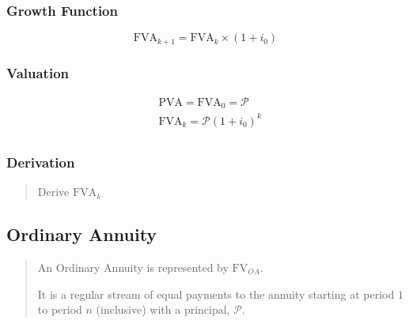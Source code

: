 \documentclass{article} %
\newcommand{\FVA}{\mathrm{FVA}} %
\newcommand{\PVA}{\mathrm{PVA}} %
\newcommand{\FV}{\mathrm{FV}} %
\newcommand{\p}{\mathcal{P}} %
\newcommand{\FVOA}{\FV_{O\!A}} %
\begin{document}
\subsubsection{Growth Function}
\[\FVA_{k+1} = \FVA_{k} \times (1 + i_0)\]

\subsubsection{Valuation}
\begin{align*}
     & \PVA = \FVA_0 = \p        \\
     & \FVA_k = \p (1 + i_0) ^ k \\
\end{align*}
\subsubsection{Derivation}
\begin{quote}
    Derive $\FVA_{k}$
\end{quote}

\subsection{Ordinary Annuity}
\begin{quote}
    An Ordinary Annuity is represented by $\FVOA$.

    It is a regular stream of equal payments to the annuity starting at period $1$ to period $n$ (inclusive) with a principal, $\p$.
\end{quote}
\end{document}
